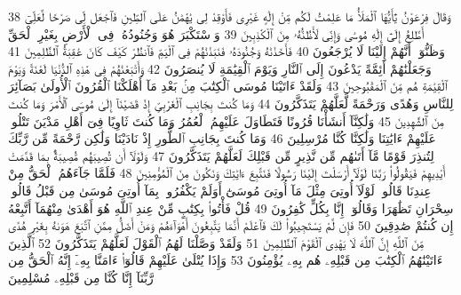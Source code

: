 {\tiny\colorbox{cl_aya}{38}} وَقَالَ فِرْعَوْنُ يَٰٓأَيُّهَا ٱلْمَلَأُ مَا عَلِمْتُ لَكُم مِّنْ إِلَٰهٍ غَيْرِى فَأَوْقِدْ لِى يَٰهَٰمَٰنُ عَلَى ٱلطِّينِ فَٱجْعَل لِّى صَرْحًا لَّعَلِّىٓ أَطَّلِعُ إِلَىٰٓ إِلَٰهِ مُوسَىٰ وَإِنِّى لَأَظُنُّهُۥ مِنَ ٱلْكَٰذِبِينَ
{\tiny\colorbox{cl_aya}{39}} وَٱسْتَكْبَرَ هُوَ وَجُنُودُهُۥ فِى ٱلْأَرْضِ بِغَيْرِ ٱلْحَقِّ وَظَنُّوٓا۟ أَنَّهُمْ إِلَيْنَا لَا يُرْجَعُونَ
{\tiny\colorbox{cl_aya}{40}} فَأَخَذْنَٰهُ وَجُنُودَهُۥ فَنَبَذْنَٰهُمْ فِى ٱلْيَمِّ فَٱنظُرْ كَيْفَ كَانَ عَٰقِبَةُ ٱلظَّٰلِمِينَ
{\tiny\colorbox{cl_aya}{41}} وَجَعَلْنَٰهُمْ أَئِمَّةً يَدْعُونَ إِلَى ٱلنَّارِ وَيَوْمَ ٱلْقِيَٰمَةِ لَا يُنصَرُونَ
{\tiny\colorbox{cl_aya}{42}} وَأَتْبَعْنَٰهُمْ فِى هَٰذِهِ ٱلدُّنْيَا لَعْنَةً وَيَوْمَ ٱلْقِيَٰمَةِ هُم مِّنَ ٱلْمَقْبُوحِينَ
{\tiny\colorbox{cl_aya}{43}} وَلَقَدْ ءَاتَيْنَا مُوسَى ٱلْكِتَٰبَ مِنۢ بَعْدِ مَآ أَهْلَكْنَا ٱلْقُرُونَ ٱلْأُولَىٰ بَصَآئِرَ لِلنَّاسِ وَهُدًى وَرَحْمَةً لَّعَلَّهُمْ يَتَذَكَّرُونَ
{\tiny\colorbox{cl_aya}{44}} وَمَا كُنتَ بِجَانِبِ ٱلْغَرْبِىِّ إِذْ قَضَيْنَآ إِلَىٰ مُوسَى ٱلْأَمْرَ وَمَا كُنتَ مِنَ ٱلشَّٰهِدِينَ
{\tiny\colorbox{cl_aya}{45}} وَلَٰكِنَّآ أَنشَأْنَا قُرُونًا فَتَطَاوَلَ عَلَيْهِمُ ٱلْعُمُرُ وَمَا كُنتَ ثَاوِيًا فِىٓ أَهْلِ مَدْيَنَ تَتْلُوا۟ عَلَيْهِمْ ءَايَٰتِنَا وَلَٰكِنَّا كُنَّا مُرْسِلِينَ
{\tiny\colorbox{cl_aya}{46}} وَمَا كُنتَ بِجَانِبِ ٱلطُّورِ إِذْ نَادَيْنَا وَلَٰكِن رَّحْمَةً مِّن رَّبِّكَ لِتُنذِرَ قَوْمًا مَّآ أَتَىٰهُم مِّن نَّذِيرٍ مِّن قَبْلِكَ لَعَلَّهُمْ يَتَذَكَّرُونَ
{\tiny\colorbox{cl_aya}{47}} وَلَوْلَآ أَن تُصِيبَهُم مُّصِيبَةٌۢ بِمَا قَدَّمَتْ أَيْدِيهِمْ فَيَقُولُوا۟ رَبَّنَا لَوْلَآ أَرْسَلْتَ إِلَيْنَا رَسُولًا فَنَتَّبِعَ ءَايَٰتِكَ وَنَكُونَ مِنَ ٱلْمُؤْمِنِينَ
{\tiny\colorbox{cl_aya}{48}} فَلَمَّا جَآءَهُمُ ٱلْحَقُّ مِنْ عِندِنَا قَالُوا۟ لَوْلَآ أُوتِىَ مِثْلَ مَآ أُوتِىَ مُوسَىٰٓ أَوَلَمْ يَكْفُرُوا۟ بِمَآ أُوتِىَ مُوسَىٰ مِن قَبْلُ قَالُوا۟ سِحْرَانِ تَظَٰهَرَا وَقَالُوٓا۟ إِنَّا بِكُلٍّ كَٰفِرُونَ
{\tiny\colorbox{cl_aya}{49}} قُلْ فَأْتُوا۟ بِكِتَٰبٍ مِّنْ عِندِ ٱللَّهِ هُوَ أَهْدَىٰ مِنْهُمَآ أَتَّبِعْهُ إِن كُنتُمْ صَٰدِقِينَ
{\tiny\colorbox{cl_aya}{50}} فَإِن لَّمْ يَسْتَجِيبُوا۟ لَكَ فَٱعْلَمْ أَنَّمَا يَتَّبِعُونَ أَهْوَآءَهُمْ وَمَنْ أَضَلُّ مِمَّنِ ٱتَّبَعَ هَوَىٰهُ بِغَيْرِ هُدًى مِّنَ ٱللَّهِ إِنَّ ٱللَّهَ لَا يَهْدِى ٱلْقَوْمَ ٱلظَّٰلِمِينَ
{\tiny\colorbox{cl_aya}{51}} وَلَقَدْ وَصَّلْنَا لَهُمُ ٱلْقَوْلَ لَعَلَّهُمْ يَتَذَكَّرُونَ
{\tiny\colorbox{cl_aya}{52}} ٱلَّذِينَ ءَاتَيْنَٰهُمُ ٱلْكِتَٰبَ مِن قَبْلِهِۦ هُم بِهِۦ يُؤْمِنُونَ
{\tiny\colorbox{cl_aya}{53}} وَإِذَا يُتْلَىٰ عَلَيْهِمْ قَالُوٓا۟ ءَامَنَّا بِهِۦٓ إِنَّهُ ٱلْحَقُّ مِن رَّبِّنَآ إِنَّا كُنَّا مِن قَبْلِهِۦ مُسْلِمِينَ
